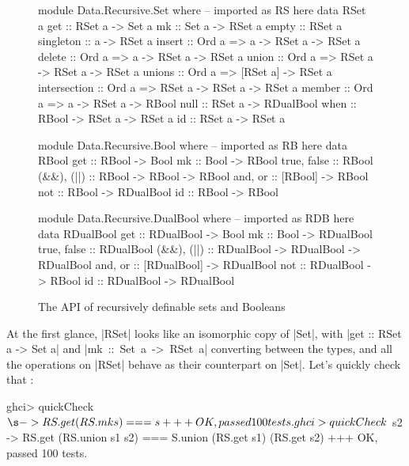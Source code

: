 \documentclass[manuscript,screen,acmsmall,nonacm]{acmart}
\begin{document}
\afterpage{\clearpage}
\begin{figure}[p]
\begin{code}
module Data.Recursive.Set where       -- imported as RS here
  data RSet a
  get           ::           RSet a ->            Set a
  mk            ::           Set a ->             RSet a
  empty         ::                                RSet a
  singleton     ::           a ->                 RSet a
  insert        :: Ord a =>  a -> RSet a ->       RSet a
  delete        :: Ord a =>  a -> RSet a ->       RSet a
  union         :: Ord a =>  RSet a -> RSet a ->  RSet a
  unions        :: Ord a =>  [RSet a] ->          RSet a
  intersection  :: Ord a =>  RSet a -> RSet a ->  RSet a
  member        :: Ord a =>  a -> RSet a ->       RBool
  null          ::           RSet a ->            RDualBool
  when          ::           RBool -> RSet a ->   RSet a
  id            ::           RSet a ->            RSet a

module Data.Recursive.Bool where      -- imported as RB here
  data RBool
  get          :: RBool ->           Bool
  mk           :: Bool ->            RBool
  true, false  ::                    RBool
  (&&), (||)   :: RBool -> RBool ->  RBool
  and, or      :: [RBool] ->         RBool
  not          :: RBool ->           RDualBool
  id           :: RBool ->           RBool

module Data.Recursive.DualBool where  -- imported as RDB here
  data RDualBool
  get          ::  RDualBool ->               Bool
  mk           ::  Bool ->                    RDualBool
  true, false  ::                             RDualBool
  (&&), (||)   ::  RDualBool -> RDualBool ->  RDualBool
  and, or      ::  [RDualBool] ->             RDualBool
  not          ::  RDualBool ->               RBool
  id           ::  RDualBool ->               RDualBool
\end{code}
\caption{The API of recursively definable sets and Booleans}\label{fig:api}
\end{figure}

At the first glance, |RSet| looks like an isomorphic copy of |Set|, with |get :: RSet a -> Set a| and \mbox{|mk :: Set a -> RSet a|} converting between the types, and all the operations on |RSet| behave as their counterpart on |Set|. Let's quickly check that \citep{quickcheck}:
\begin{code}
ghci> quickCheck $ \s -> RS.get (RS.mk s) === s
+++ OK, passed 100 tests.
ghci> quickCheck $  s2 -> RS.get (RS.union s1 s2) === S.union (RS.get s1) (RS.get s2)
+++ OK, passed 100 tests.
\end{code}
\end{document}
